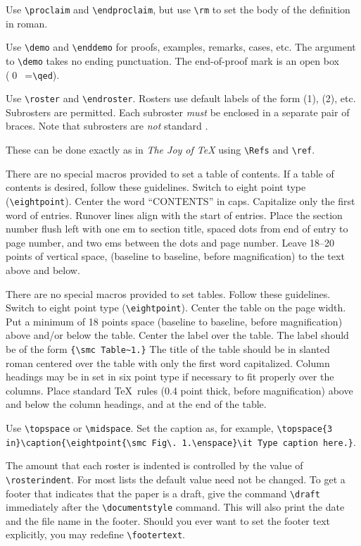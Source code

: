  Use \verb"\proclaim" and \verb"\endproclaim",
but use \verb"\rm" to set the body of the definition in roman.

 Use \verb"\demo" and \verb"\enddemo"
for proofs, examples, remarks, cases, etc.  The
argument to \verb"\demo" takes no ending punctuation.  The
end-of-proof mark is an open box (\qed\ =\thinspace\verb"\qed").

  Use \verb"\roster" and \verb"\endroster".
Rosters use default labels of the form (1), (2), etc.
Subrosters are permitted.  Each subroster {\it must} be enclosed
in a separate pair of braces. Note that subrosters are {\it not}
standard \AmSTeX.
 
 These can be done exactly as in {\it The Joy
of \TeX} using \verb"\Refs" and \verb"\ref".

 There are no special macros provided to set
a table of contents.  If a table of contents is desired, follow these
guidelines.  Switch to eight point type (\verb"\eightpoint").
Center the word ``CONTENTS'' in caps.  Capitalize only the first word
of entries.  Runover lines align with the start of entries.
Place the section number flush left with one em to section title,
spaced dots from end of entry to page number, and two ems between the
dots and page number.  Leave 18--20 points 
of vertical space, (baseline
to baseline, before magnification) to the text above and below.

 There are no special macros provided to set
tables.  Follow these guidelines.
Switch to eight point type (\verb"\eightpoint").
Center the table on the page width.  Put a minimum
of  18 points
space (baseline to baseline, before magnification) above and/or below the table.
Center the label over the table.  The label
should be of the form \verb"{\smc Table~1.}"  The title of the table should
be in slanted roman centered over the table with only the first word capitalized.
Column headings may be in set in six point type if necessary to fit properly
over the columns.  Place  standard \TeX\ rules (0.4 point thick, before
magnification)
above and below the column headings, and at the end of the table.

 Use \verb"\topspace" or \verb"\midspace".
Set the caption as, for example,
\verb"\topspace{3 in}\caption{\eightpoint{\smc Fig\. 1.\enspace}\it Type caption here.}".

The amount that each roster is indented is controlled by the value of
\verb"\rosterindent".  For most lists the default value need not
be changed.
To get a footer that indicates
that the paper is a draft, give the command \verb"\draft" immediately
after the \verb"\documentstyle" command.  This will also print the
date and the file name in the footer.
Should you ever want to set the footer text explicitly,
you may redefine  \verb"\footertext".

